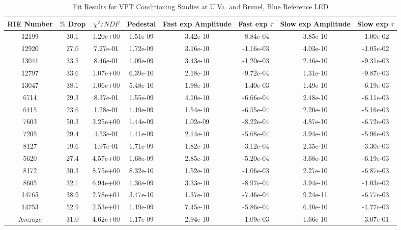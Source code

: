 \begin{table}[ht] 
\begin{adjustwidth}{-1.7in}{-1.7in} 
  \centering 
  \noindent 
  \small 
    \caption{Fit Results for VPT Conditioning Studies at U.Va. and Brunel, Blue Reference LED} 
    \label{tab:UVaRig_blue} 
    \begin{tabular}{|c|c|c|c|c|c|c|c|} \hline 
RIE Number & $\%$ Drop & $\chi^2/NDF$ & Pedestal & Fast exp Amplitude & Fast exp $\tau$ & Slow exp Amplitude & Slow exp $\tau$  \\ \hline 
 
12199  & 30.1 & 1.20e+00 & 1.51e-09 & 3.42e-10 & -8.84e-04 & 3.85e-10 & -1.00e-02\\ \hline 
12920  & 27.0 & 7.27e-01 & 1.72e-09 & 3.16e-10 & -1.16e-03 & 4.03e-10 & -1.05e-02\\ \hline 
13041  & 33.5 & 8.46e-01 & 1.09e-09 & 3.43e-10 & -1.20e-03 & 2.46e-10 & -9.31e-03\\ \hline 
12797  & 33.6 & 1.07e+00 & 6.39e-10 & 2.18e-10 & -9.72e-04 & 1.31e-10 & -9.87e-03\\ \hline 
13047  & 38.1 & 1.06e+00 & 5.48e-10 & 1.98e-10 & -1.40e-03 & 1.49e-10 & -6.19e-03\\ \hline 
6714  & 29.3 & 8.37e-01 & 1.55e-09 & 4.10e-10 & -6.66e-04 & 2.48e-10 & -6.11e-03\\ \hline 
6415  & 23.6 & 1.28e-01 & 1.19e-09 & 1.54e-10 & -6.55e-04 & 2.20e-10 & -5.16e-03\\ \hline 
7603  & 50.3 & 3.25e+00 & 1.44e-09 & 1.02e-09 & -8.22e-04 & 4.87e-10 & -6.72e-03\\ \hline 
7205  & 29.4 & 4.53e-01 & 1.41e-09 & 2.14e-10 & -5.68e-04 & 3.94e-10 & -5.96e-03\\ \hline 
8127  & 19.6 & 1.97e-01 & 1.71e-09 & 1.82e-10 & -3.12e-04 & 2.35e-10 & -3.30e-03\\ \hline 
5620  & 27.4 & 4.57e+00 & 1.68e-09 & 2.85e-10 & -5.20e-04 & 3.68e-10 & -6.19e-03\\ \hline 
8172  & 30.3 & 8.75e+00 & 8.32e-10 & 1.52e-10 & -1.06e-03 & 2.27e-10 & -6.87e-03\\ \hline 
8605  & 32.1 & 6.94e+00 & 1.36e-09 & 3.33e-10 & -8.97e-04 & 3.94e-10 & -1.03e-02\\ \hline 
14765  & 38.9 & 2.78e+01 & 3.47e-10 & 1.37e-10 & -7.46e-04 & 9.24e-11 & -6.77e-03\\ \hline 
14753  & 52.9 & 2.53e+01 & 1.19e-09 & 7.45e-10 & -5.86e-04 & 6.10e-10 & -4.77e-03\\ \hline 
Average  & 31.0 & 4.62e+00 & 1.17e-09 & 2.94e-10 & -1.09e-03 & 1.66e-10 & -3.07e-01 \\ \hline 
    \end{tabular} 
  \end{adjustwidth} 
\end{table} 



